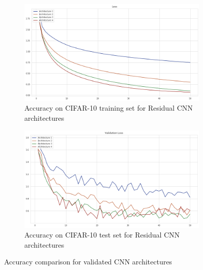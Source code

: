 \documentclass{article}
\begin{document}
\begin{figure}[!h]
\begin{subfigure}{.5\textwidth}
  \centering
  \includegraphics[width=1\linewidth]{resnet_experimentloss.png}  
  \caption{Accuracy on CIFAR-10 training set for Residual CNN architectures}
  \label{fig:sub-first}
\end{subfigure}
\begin{subfigure}{.5\textwidth}
  \centering
  \includegraphics[width=1\linewidth]{resnet_experimentval_loss.png}  
  \caption{Accuracy on CIFAR-10 test set for Residual CNN architectures}
  \label{fig:sub-second}
\end{subfigure}
\caption{Accuracy comparison for validated CNN architectures}
\label{plots_acc}
\end{figure}
\end{document}
